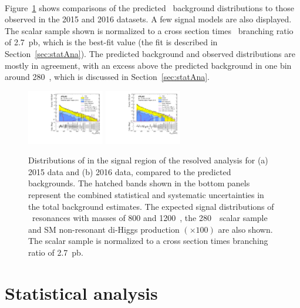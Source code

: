 \paragraph{}
Figure~\ref{fig:resolvedHHUnblinded} shows comparisons of the predicted \mfourj~background distributions to those observed in the 2015 and 2016 datasets. 
A few signal models are also displayed. 
The scalar sample shown is normalized to a cross section times \hbb\ branching ratio of 2.7~pb, which is the best-fit value (the fit is described in Section~\ref{sec:statAna}). 
The predicted background and observed distributions are mostly in agreement, with an excess above the predicted background in one bin around 280~\GeV, which is discussed in Section~\ref{sec:statAna}.

\begin{figure}[!ht]
\begin{center}
\includegraphics[width=0.3\textwidth,angle=-90]{figures/resolved/results/data_2015_hh_v_logy.pdf}
\includegraphics[width=0.3\textwidth,angle=-90]{figures/resolved/results/data_2016_hh_v_logy.pdf}
\caption{Distributions of \mfourj in the signal region of the resolved analysis for (a) 2015 data and (b) 2016 data, compared to the predicted backgrounds. The hatched bands shown in the bottom panels represent the combined statistical and systematic uncertainties in the total background estimates. The expected signal distributions of \Grav\ resonances with masses of 800 and 1200~\GeV, the 280~\GeV\ scalar sample and SM non-resonant di-Higgs production $(\times 100)$ are also shown. The scalar sample is normalized to a cross section times branching ratio of 2.7~pb.}
\label{fig:resolvedHHUnblinded}
\end{center}
\end{figure}


\section{Statistical analysis}
\label{sec:observedlimits}

